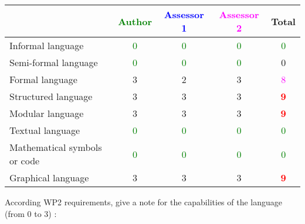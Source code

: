 \begin{tabular}{|l | c | c | c | c|}
  \hline
  & \textcolor{green}{Author} & \textcolor{blue}{Assessor 1} & \textcolor{magenta}{Assessor 2} & Total \\
  \hline 
  Informal language & \textcolor{green}{0}   & \textcolor{green}{0}   & \textcolor{green}{0} & \textcolor{green}{0}  \\
  \hline 
  Semi-formal language & \textcolor{green}{0}   & \textcolor{green}{0}   & \textcolor{green}{0} &  0 \\
  \hline
  Formal language &3 &2 & 3    & \textcolor{magenta}{8} \\
  \hline
  Structured language &3 &3 & 3    & \textcolor{red}{\textbf{9}} \\
  \hline
  Modular language &3 &3 & 3    & \textcolor{red}{\textbf{9}} \\
  \hline
  Textual language & \textcolor{green}{0}   & \textcolor{green}{0}   & \textcolor{green}{0} & \textcolor{green}{0} \\
  \hline
  Mathematical symbols or code & \textcolor{green}{0}   & \textcolor{green}{0}   & \textcolor{green}{0} & \textcolor{green}{0} \\
  \hline
  Graphical language &3 &3 & 3    & \textcolor{red}{\textbf{9}} \\
  \hline
\end{tabular}

According WP2 requirements, give a note for the capabilities of the language (from 0 to 3) :

